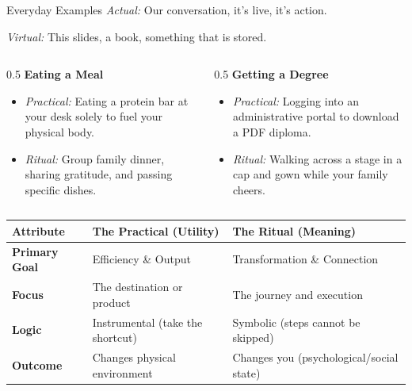 \documentclass[aspectratio=43,10pt]{beamer}
\begin{document}
\begin{frame}{Everyday Examples}
    \textit{Actual:} Our conversation, it's live, it's action.
    
    \textit{Virtual:} This slides, a book, something that is stored.
    
    \pause
    
    \vspace{1cm}
    \begin{columns}
        \begin{column}{0.5\textwidth}
            \textbf{Eating a Meal}
            \begin{itemize}
                \item \textit{Practical:} Eating a protein bar at your desk solely to fuel your physical body.
                \item \textit{Ritual:} Group family dinner, sharing gratitude, and passing specific dishes.
            \end{itemize}
        \end{column}
        \begin{column}{0.5\textwidth}
            \textbf{Getting a Degree}
            \begin{itemize}
                \item \textit{Practical:} Logging into an administrative portal to download a PDF diploma.
                \item \textit{Ritual:} Walking across a stage in a cap and gown while your family cheers.
            \end{itemize}
        \end{column}
    \end{columns}
\end{frame}


\begin{frame}{}
    \begin{table}
    \centering
    \small
    \begin{tabular}{|l|p{4cm}|p{4cm}|}
    \hline
    \textbf{Attribute} & \textbf{The Practical (Utility)} & \textbf{The Ritual (Meaning)} \\ \hline
    \textbf{Primary Goal} & Efficiency \& Output & Transformation \& Connection \\ \hline
    \textbf{Focus} & The destination or product & The journey and execution \\ \hline
    \textbf{Logic} & Instrumental (take the shortcut) & Symbolic (steps cannot be skipped) \\ \hline
    \textbf{Outcome} & Changes physical environment & Changes you (psychological/social state) \\ \hline
    \end{tabular}
    \end{table}
\end{frame}
\end{document}
